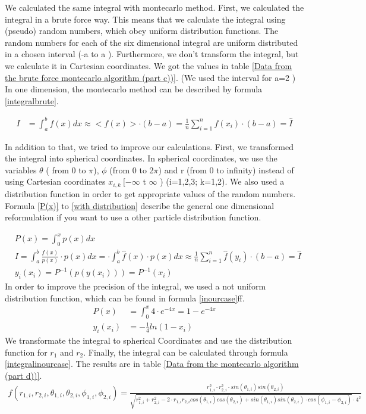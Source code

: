 \documentclass[10pt,a4paper]{article}
\begin{document}
We calculated the same integral with montecarlo method. First, we calculated the integral in a brute force way. This means that we calculate the integral using (pseudo) random numbers, which obey uniform distribution functions. The random numbers for each of the six dimensional integral are uniform distributed in a chosen interval (-a to a ). Furthermore, we don't transform the integral, but we calculate it in Cartesian coordinates. We got the values in table \ref{Data from the brute force montecarlo algorithm (part c))}. (We used the interval for a=2 ) In one dimension, the montecarlo method can be described by formula \ref{integralbrute}. 

\begin{align}
I &= \int_{a}^{b} f(x) dx \approx < f(x) > \cdot (b-a) = \frac{1}{n} \sum_{i=1}^{n} f(x_i) \cdot (b-a) = \hat{I} \label{integralbrute}
\end{align}
 
In addition to that, we tried to improve our calculations. First, we transformed the integral into spherical coordinates. In spherical coordinates, we use the variables $\theta$ ( from 0 to $\pi$), $\phi$ (from 0 to 2$\pi$) and r (from 0 to infinity) instead of using Cartesian coordinates $x_{i,k} \ [-\infty$ t $\infty$ ) (i=1,2,3; k=1,2). We also used a distribution function in order to get appropriate values of the random numbers.  Formula \ref{P(x)} to \ref{with distribution} describe the general one dimensional reformulation if you want to use a other particle distribution function. 


\begin{align}
&P(x) = \int_{0}^{x} p(x) dx \label{P(x)}\\
& I =  \int_{a}^{b} \frac{f(x)}{p(x)} \cdot p(x) dx = \cdot \int_{a}^{b} \hat{f}(x) \cdot p(x) dx \approx  \frac{1}{n} \sum_{i=1}^{n} \hat{f}(y_i) \cdot (b-a) = \hat{I} \\
&y_i(x_i) =P^{-1}\left(p(y(x_i))\right)= P^{-1}(x_i)\label{with distribution}
\end{align}
In order to improve the precision of the integral, we used a not uniform distribution function, which can be found in formula \ref{inourcase}ff. 
\begin{align}
P(x)&= \int_{0}^{x} 4 \cdot e^{-4 x} = 1- e^{-4x} \label{inourcase}\\
y_i(x_i)&= -\frac{1}{4} ln(1-x_i)
\end{align}
We transformate the integral to spherical Coordinates and use the distribution function for $r_1$ and $r_2$. Finally, the integral can be calculated through formula \ref{integralinourcase}. The results are in table \ref{Data from the  montecarlo algorithm (part d))}.
\begin{align}
f( r_{1,i}, r_{2,i}, \theta_{1,i}, \theta_{2,i}, \phi_{1,i}, \phi_{2,i}) = \frac{r_{1,i}^2 \cdot r_{2,i}^2 \cdot sin(\theta_{1,i}) sin(\theta_{2,i}) }{\sqrt{r_{1,i}^2+r_{2,i}^2-2 \cdot r_{1,i} r_{2,i}  cos(\theta_{1,i}) cos(\theta_{2,i}) + sin(\theta_{1,i}) sin(\theta_{2,i}) \cdot cos(\phi_{1,i}-\phi_{2,i})}\cdot 4^2}
\end{align}
\end{document}
